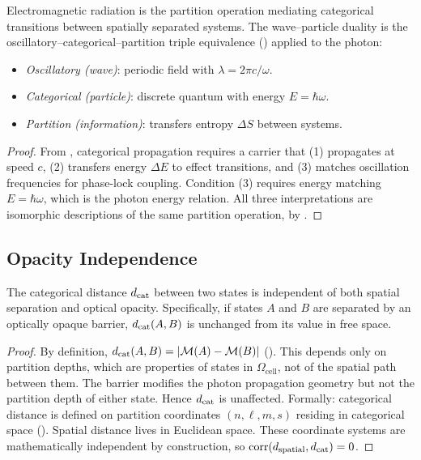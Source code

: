 \begin{theorem}
\label{thm:photon-identity}
Electromagnetic radiation is the partition operation mediating categorical
transitions between spatially separated systems.  The wave--particle duality
is the oscillatory--categorical--partition triple equivalence
() applied to the photon:
\begin{itemize}[noitemsep]
    \item \emph{Oscillatory (wave)}: periodic field with $\lambda = 2\pi c/\omega$.
    \item \emph{Categorical (particle)}: discrete quantum with energy
          $E = \hbar\omega$.
    \item \emph{Partition (information)}: transfers entropy $\Delta S$ between
          systems.
\end{itemize}
\end{theorem}

\begin{proof}
From , categorical propagation requires a carrier that
(1) propagates at speed $c$, (2) transfers energy $\Delta E$ to effect
transitions, and (3) matches oscillation frequencies for phase-lock coupling.
Condition (3) requires energy matching $E = \hbar\omega$, which is the photon
energy relation.  All three interpretations are isomorphic descriptions of the
same partition operation, by .
\end{proof}

\subsection{Opacity Independence}

\begin{theorem}
\label{thm:opacity}
The categorical distance $d_{\mathrm{cat}}$ between two states is independent of both
spatial separation and optical opacity.  Specifically, if states $A$ and $B$
are separated by an optically opaque barrier, $d_{\mathrm{cat}}(A,B)$ is unchanged from
its value in free space.
\end{theorem}

\begin{proof}
By definition, $d_{\mathrm{cat}}(A,B) = |\mathcal{M}(A) - \mathcal{M}(B)|$
().  This depends only on partition depths, which are
properties of states in $\Omega_\mathrm{cell}$, not of the spatial path between
them.  The barrier modifies the photon propagation geometry but not the
partition depth of either state.  Hence $d_{\mathrm{cat}}$ is unaffected.
Formally: categorical distance is defined on partition coordinates
$(n,\ell,m,s)$ residing in categorical space ().
Spatial distance lives in Euclidean space.  These coordinate systems are
mathematically independent by construction, so
$\mathrm{corr}(d_\mathrm{spatial}, d_{\mathrm{cat}}) = 0$.
\end{proof}

